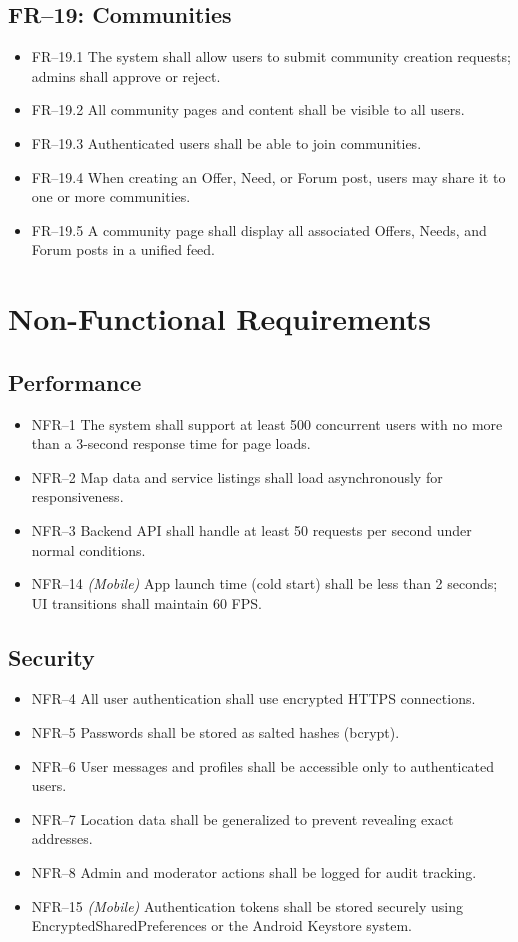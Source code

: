 \documentclass[10pt,a4paper]{report}
\begin{document}
\subsection{FR--19: Communities}
\begin{itemize}
    \item FR--19.1 The system shall allow users to submit community creation requests; admins shall approve or reject.
    \item FR--19.2 All community pages and content shall be visible to all users.
    \item FR--19.3 Authenticated users shall be able to join communities.
    \item FR--19.4 When creating an Offer, Need, or Forum post, users may share it to one or more communities.
    \item FR--19.5 A community page shall display all associated Offers, Needs, and Forum posts in a unified feed.
\end{itemize}

\section{Non-Functional Requirements}

\subsection{Performance}
\begin{itemize}
    \item NFR--1 The system shall support at least 500 concurrent users with no more than a 3-second response time for page loads.
    \item NFR--2 Map data and service listings shall load asynchronously for responsiveness.
    \item NFR--3 Backend API shall handle at least 50 requests per second under normal conditions.
    \item NFR--14 \textit{(Mobile)} App launch time (cold start) shall be less than 2 seconds; UI transitions shall maintain 60 FPS.
\end{itemize}

\subsection{Security}
\begin{itemize}
    \item NFR--4 All user authentication shall use encrypted HTTPS connections.
    \item NFR--5 Passwords shall be stored as salted hashes (bcrypt).
    \item NFR--6 User messages and profiles shall be accessible only to authenticated users.
    \item NFR--7 Location data shall be generalized to prevent revealing exact addresses.
    \item NFR--8 Admin and moderator actions shall be logged for audit tracking.
    \item NFR--15 \textit{(Mobile)} Authentication tokens shall be stored securely using EncryptedSharedPreferences or the Android Keystore system.
\end{itemize}
\end{document}
